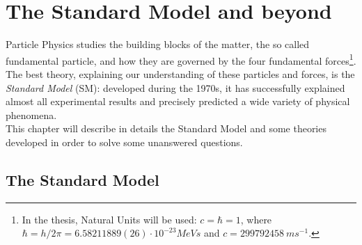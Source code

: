 \chapter{The Standard Model and beyond}
\label{Chapter1}

Particle Physics studies the building blocks of the matter, the so called fundamental particle, and how they are governed by the four fundamental forces\footnote{In the thesis, Natural Units will be used: $c=\hbar=1$,  where $\hbar=h/2\pi=6.58211889(26)\cdot10^{-23}MeV s$ and $c=299792458~ms^{-1}$.}. \\
The best theory, explaining our  understanding of these particles and forces, is the \textit{Standard Model} (SM): developed during the 1970s, it has successfully explained almost all experimental results and precisely predicted a wide variety of physical phenomena. \\
This chapter will describe in details the Standard Model and some theories developed in order to solve some unanswered questions.

\section{The Standard Model}
\label{cap1:SM}
